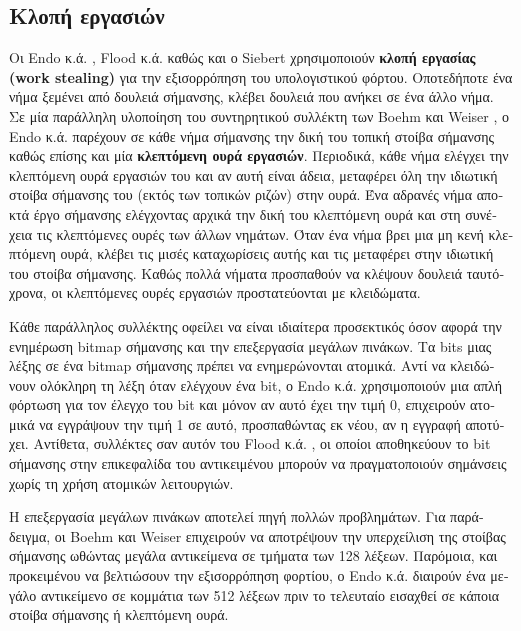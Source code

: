 \begin{greek}
\subsection{Κλοπή εργασιών}
Οι Endo κ.ά. \cite{DBLP:conf/sc/EndoTY97}, Flood κ.ά. \cite{DBLP:conf/jvm/FloodDSZ01}
καθώς και ο Siebert \cite{DBLP:conf/iwmm/Siebert10} χρησιμοποιούν 
\textbf{κλοπή εργασίας (work stealing)} για την εξισορρόπηση
του υπολογιστικού φόρτου. Οποτεδήποτε ένα νήμα ξεμένει από
δουλειά σήμανσης, κλέβει δουλειά που ανήκει σε ένα άλλο νήμα.
Σε μία παράλληλη υλοποίηση του συντηρητικού συλλέκτη των Boehm
και Weiser \cite{DBLP:journals/spe/BoehmW88}, ο Endo κ.ά. παρέχουν
σε κάθε νήμα σήμανσης την δική του τοπική στοίβα σήμανσης καθώς
επίσης και μία \textbf{κλεπτόμενη ουρά εργασιών}. Περιοδικά,
κάθε νήμα ελέγχει την κλεπτόμενη ουρά εργασιών του και αν αυτή
είναι άδεια, μεταφέρει όλη την ιδιωτική στοίβα σήμανσης του (εκτός
των τοπικών ριζών) στην ουρά. Ένα αδρανές νήμα αποκτά έργο σήμανσης
ελέγχοντας αρχικά την δική του κλεπτόμενη ουρά και στη συνέχεια
τις κλεπτόμενες ουρές των άλλων νημάτων. Όταν ένα νήμα βρει μια
μη κενή κλεπτόμενη ουρά, κλέβει τις μισές καταχωρίσεις αυτής
και τις μεταφέρει στην ιδιωτική του στοίβα σήμανσης. Καθώς πολλά
νήματα προσπαθούν να κλέψουν δουλειά ταυτόχρονα, οι κλεπτόμενες
ουρές εργασιών προστατεύονται με κλειδώματα. 

Κάθε παράλληλος συλλέκτης οφείλει να είναι ιδιαίτερα προσεκτικός
όσον αφορά την ενημέρωση bitmap σήμανσης και την επεξεργασία
μεγάλων πινάκων. Τα bits μιας λέξης σε ένα bitmap σήμανσης πρέπει
να ενημερώνονται ατομικά. Αντί να κλειδώνουν ολόκληρη τη λέξη
όταν ελέγχουν ένα bit, ο Endo κ.ά. χρησιμοποιούν μια απλή φόρτωση
για τον έλεγχο του bit και μόνον αν αυτό έχει την τιμή 0, επιχειρούν
ατομικά να εγγράψουν την τιμή 1 σε αυτό, προσπαθώντας εκ νέου,
αν η εγγραφή αποτύχει. Αντίθετα, συλλέκτες σαν αυτόν του Flood
κ.ά. \cite{DBLP:conf/jvm/FloodDSZ01}, οι οποίοι αποθηκεύουν το
bit σήμανσης στην επικεφαλίδα του αντικειμένου μπορούν να
πραγματοποιούν σημάνσεις χωρίς τη χρήση ατομικών λειτουργιών.

Η επεξεργασία μεγάλων πινάκων αποτελεί πηγή πολλών προβλημάτων.
Για παράδειγμα, οι Boehm και Weiser \cite{DBLP:journals/spe/BoehmW88}
επιχειρούν να αποτρέψουν την υπερχείλιση της στοίβας σήμανσης
ωθώντας μεγάλα αντικείμενα σε τμήματα των 128 λέξεων. Παρόμοια,
και προκειμένου να βελτιώσουν την εξισορρόπηση φορτίου, ο Endo
κ.ά. διαιρούν ένα μεγάλο αντικείμενο σε κομμάτια των 512 λέξεων 
πριν το τελευταίο εισαχθεί σε κάποια στοίβα σήμανσης ή κλεπτόμενη 
ουρά.


\end{greek}
